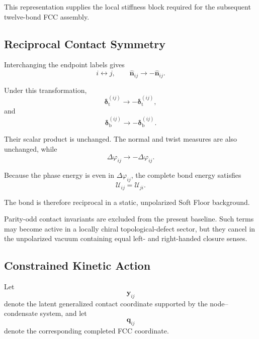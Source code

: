 This representation supplies the local stiffness block required for the subsequent twelve-bond FCC assembly.

\subsection{Reciprocal Contact Symmetry}

Interchanging the endpoint labels gives
\begin{equation}
    i \leftrightarrow j, \qquad \hat{\mathbf{n}}_{ij} \rightarrow -\hat{\mathbf{n}}_{ij}.
\end{equation}

Under this transformation,
\begin{equation}
    \boldsymbol{\delta}_{\mathrm{t}}^{(ij)} \rightarrow -\boldsymbol{\delta}_{\mathrm{t}}^{(ij)},
\end{equation}
and
\begin{equation}
    \boldsymbol{\delta}_{\mathrm{b}}^{(ij)} \rightarrow -\boldsymbol{\delta}_{\mathrm{b}}^{(ij)}.
\end{equation}

Their scalar product is unchanged. The normal and twist measures are also unchanged, while
\begin{equation}
    \Delta\varphi_{ij} \rightarrow -\Delta\varphi_{ij}.
\end{equation}

Because the phase energy is even in $\Delta\varphi_{ij}$, the complete bond energy satisfies
\begin{equation}
    \boxed{ \mathcal{U}_{ij} = \mathcal{U}_{ji} }.
\end{equation}

The bond is therefore reciprocal in a static, unpolarized Soft Floor background.

Parity-odd contact invariants are excluded from the present baseline. Such terms may become active in a locally chiral topological-defect sector, but they cancel in the unpolarized vacuum containing equal left- and right-handed closure senses.

\subsection{Constrained Kinetic Action}

Let
\begin{equation}
    \mathbf{y}_{ij}
\end{equation}
denote the latent generalized contact coordinate supported by the node--condensate system, and let
\begin{equation}
    \mathbf{q}_{ij}
\end{equation}
denote the corresponding completed FCC coordinate.

